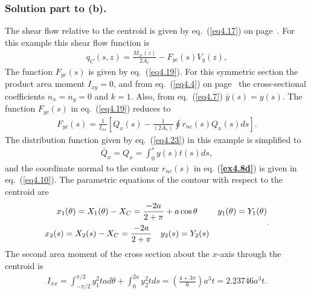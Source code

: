 \documentclass{AeroStructure-ERJohnson}
\begin{document}
\begin{example*}
\subsubsection{Solution part to (b).} The shear flow relative to the centroid is given by eq.~(\ref{eq4.17}) on page~\pageref{eq4.17}. For this example this shear flow function\vspace*{-3pt} is
\begin{align}\label{ex4.8c}
q_{C}(s, z)=\frac{M_{z c}(z)}{2 A_{c}}-F_{y c}(s) V_{y}(z),
\end{align}
The function $F_{y c}(s)$ is given by eq.~(\ref{eq4.19}). For this symmetric section the product area moment $I_{x y}=0$, and from eq.~(\ref{eq4.4}) on page~\pageref{eq4.4} the cross-sectional coefficients $n_{x}=n_{y}=0$ and $k=1$. Also, from eq.~(\ref{eq4.7}) $\bar{y}(s)=y(s)$. The function $F_{y c}(s)$ in eq.~(\ref{eq4.19}) reduces\vspace*{-3pt} to
\begin{align}\label{ex4.8d}
F_{y c}(s)=\frac{1}{I_{x x}}\left[Q_{x}(s)-\frac{1}{\left(2 A_{c}\right)} \oint\! r_{n c}(s) Q_{x}(s) d s\right].
\end{align}
The distribution function given by eq.~(\ref{eq4.23}) in this example is simplified\vspace*{-3pt} to
\begin{align}\label{ex4.8e}
\bar{Q}_{x}=Q_{x}=\int_{0}^{s} y(s) t(s) d s,
\end{align}
and the coordinate normal to the contour $r_{n c}(s)$ in eq. (\textbf{\ref{ex4.8d}}) is given in eq.~(\ref{eq4.10}). The parametric equations of the contour with respect to the centroid\vspace*{-3pt} are
\begin{align}\label{ex4.8f}
\begin{array}{@{}cc@{}}x_{1}(\theta)=X_{1}(\theta)-X_{C}=\displaystyle\frac{-2 a}{2+\pi}+a \cos \theta & y_{1}(\theta)=Y_{1}(\theta) \\[10pt]
x_{2}(s)=X_{2}(s)-X_{C}=\displaystyle\frac{-2 a}{2+\pi} \quad y_{2}(s)=Y_{2}(s)\end{array}.
\end{align}
The second area moment of the cross section about the $x$-axis through the centroid is
\begin{align}\label{ex4.8g}
I_{x x}=\int_{-\pi/2}^{\pi/2} y_{1}^{2} t a d \theta+\int_{0}^{2 a} y_{2}^{2} t d s=\left(\frac{4+3 \pi}{6}\right) a^{3} t=2.23746 a^{3} t.
\end{align}


\end{example*}
\end{document}
